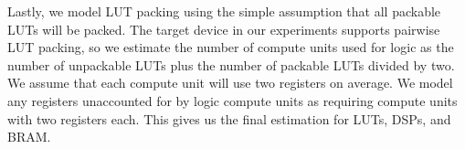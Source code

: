 Lastly, we model LUT packing using the simple assumption that all packable LUTs will be packed. The target device
in our experiments supports pairwise LUT packing, so we estimate the number of compute units used for logic as
the number of unpackable LUTs plus the number of packable LUTs divided by two. We assume that each compute unit
will use two registers on average. We model any registers unaccounted for by logic compute units as requiring
compute units with two registers each. This gives us the final estimation for LUTs, DSPs, and BRAM.




